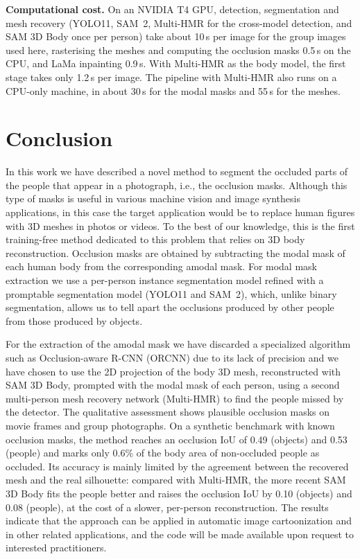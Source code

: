 \documentclass[pdflatex,sn-mathphys-num]{sn-jnl}%
\begin{document}
\textbf{Computational cost.} On an NVIDIA T4 GPU, detection, segmentation and mesh recovery (YOLO11, SAM~2, Multi-HMR for the cross-model detection, and SAM 3D Body once per person) take about 10\,s per image for the group images used here, rasterising the meshes and computing the occlusion masks 0.5\,s on the CPU, and LaMa inpainting 0.9\,s. With Multi-HMR as the body model, the first stage takes only 1.2\,s per image. The pipeline with Multi-HMR also runs on a CPU-only machine, in about 30\,s for the modal masks and 55\,s for the meshes.

\section{Conclusion}

In this work we have described a novel method to segment the occluded parts of the people that appear in a photograph, i.e., the occlusion masks. Although this type of masks is useful in various machine vision and image synthesis applications, in this case the target application would be to replace human figures with 3D meshes in photos or videos. To the best of our knowledge, this is the first training-free method dedicated to this problem that relies on 3D body reconstruction. Occlusion masks are obtained by subtracting the modal mask of each human body from the corresponding amodal mask. For modal mask extraction we use a per-person instance segmentation model refined with a promptable segmentation model (YOLO11 and SAM~2), which, unlike binary segmentation, allows us to tell apart the occlusions produced by other people from those produced by objects.

For the extraction of the amodal mask we have discarded a specialized algorithm such as Occlusion-aware R-CNN (ORCNN) due to its lack of precision and we have chosen to use the 2D projection of the body 3D mesh, reconstructed with SAM 3D Body, prompted with the modal mask of each person, using a second multi-person mesh recovery network (Multi-HMR) to find the people missed by the detector. The qualitative assessment shows plausible occlusion masks on movie frames and group photographs. On a synthetic benchmark with known occlusion masks, the method reaches an occlusion IoU of 0.49 (objects) and 0.53 (people) and marks only 0.6\% of the body area of non-occluded people as occluded. Its accuracy is mainly limited by the agreement between the recovered mesh and the real silhouette: compared with Multi-HMR, the more recent SAM 3D Body fits the people better and raises the occlusion IoU by 0.10 (objects) and 0.08 (people), at the cost of a slower, per-person reconstruction. The results indicate that the approach can be applied in automatic image cartoonization and in other related applications, and the code will be made available upon request to interested practitioners.
\end{document}
